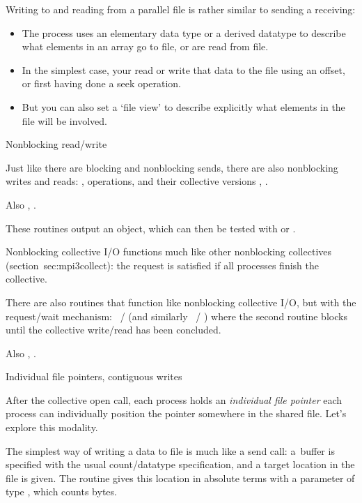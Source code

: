 Writing to and reading from a parallel file is rather similar to
sending a receiving:
\begin{itemize}
\item The process uses an elementary data type or a derived datatype
  to describe what elements in an array go to file, or are read from
  file.
\item In the simplest case, your read or write that data to the file using an
  offset, or first having done a seek operation.
\item But you can also set a `file view' to describe explicitly what
  elements in the file will be involved.
\end{itemize}

 {Nonblocking read/write}

Just like there are blocking and nonblocking sends, there are also
nonblocking writes and reads:
,
operations,
and their collective versions
,
.

Also 
,
.

These routines output an  object,
which can then be tested with
 or .

Nonblocking collective I/O functions
much like other nonblocking collectives
(section~{sec:mpi3collect}):
the request is satisfied if all processes finish the collective.

There are also  routines
that function like nonblocking collective I/O, but with the request/wait mechanism:
~/
(and similarly
~/
)
where the second routine blocks until the collective write/read
has been concluded.

Also , .

 {Individual file pointers, contiguous writes}
\label{sec:mpi-filepoint}

After the collective open call, each process holds an
\emph{individual file pointer}
each process can individually position the pointer somewhere in the shared file.
Let's explore this modality.

The simplest way of writing a data to file is much like a send call:
a~buffer is specified with the usual count/datatype specification,
and a target location in the file is given.
The routine  gives this location
in absolute terms with a parameter of type ,
which counts bytes.

